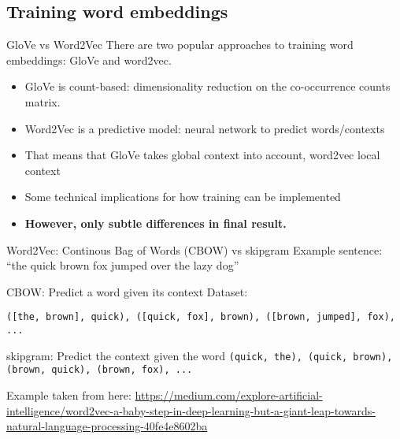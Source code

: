 \subsection{Training word embeddings}

\begin{frame}{GloVe vs Word2Vec}
  There are two popular approaches to training word embeddings: GloVe and word2vec.
  \begin{itemize}
  \item GloVe is count-based: dimensionality reduction on the co-occurrence counts matrix.
  \item Word2Vec is a predictive model: neural network to predict words/contexts
  \item That means that GloVe takes global context into account, word2vec local context
  \item Some technical implications for how training can be implemented 
  \item \textbf{However, only subtle differences in final result.}
  \end{itemize}
\end{frame}



\begin{frame}{Word2Vec: Continous Bag of Words (CBOW) vs skipgram}
  Example sentence: ``the quick brown fox jumped over the lazy dog''
  \begin{block}{CBOW: Predict a word given its context}
    Dataset:
    
    \texttt{([the, brown], quick), ([quick, fox], brown), ([brown, jumped], fox), ...}
  \end{block}
  
  \pause
  
  
  \begin{block}{skipgram: Predict the context given the word}	
    \texttt{(quick, the), (quick, brown), (brown, quick), (brown, fox), ...}
  \end{block}
  
  \tiny{Example taken from here: \url{https://medium.com/explore-artificial-intelligence/word2vec-a-baby-step-in-deep-learning-but-a-giant-leap-towards-natural-language-processing-40fe4e8602ba}}
\end{frame}



